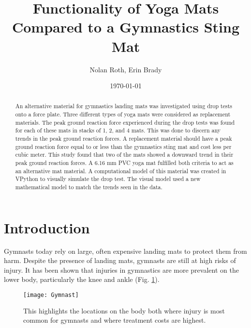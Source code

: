 \documentclass[12pt,aps,prb,preprint]{revtex4-1}   %
\begin{document}
\title{Functionality of Yoga Mats Compared to a Gymnastics Sting Mat}
\author{Nolan Roth, Erin Brady}

\date{\today}

\bigskip

\begin{abstract}
An alternative material for gymnastics landing mats was investigated using drop tests onto a force plate. Three different types of yoga mats were considered as replacement materials. The peak ground reaction force experienced during the drop tests was found for each of these mats in stacks of 1, 2, and 4 mats. This was done to discern any trends in the peak ground reaction forces. A replacement material should have a peak ground reaction force equal to or less than the gymnastics sting mat and cost less per cubic meter. This study found that two of the mats showed a downward trend in their peak ground reaction forces. A 6.16 mm PVC yoga mat fulfilled both criteria to act as an alternative mat material. A computational model of this material was created in VPython to visually simulate the drop test. The visual model used a new mathematical model to match the trends seen in the data.
\end{abstract}

\maketitle

\section{Introduction}

Gymnasts today rely on large, often expensive landing mats to protect them from harm. Despite the presence of landing mats, gymnasts are still at high risks of injury. It has been shown that injuries in gymnastics are more prevalent on the lower body, particularly the knee and ankle (Fig. \ref{fig:gymnast}).

\begin{figure}[h]
	\texttt{[image: Gymnast]}
	\caption{This highlights the locations on the body both where injury is most common for gymnasts and where treatment costs are highest\cite{Bradshaw}.}
	\label{fig:gymnast}
\end{figure}
\end{document}
